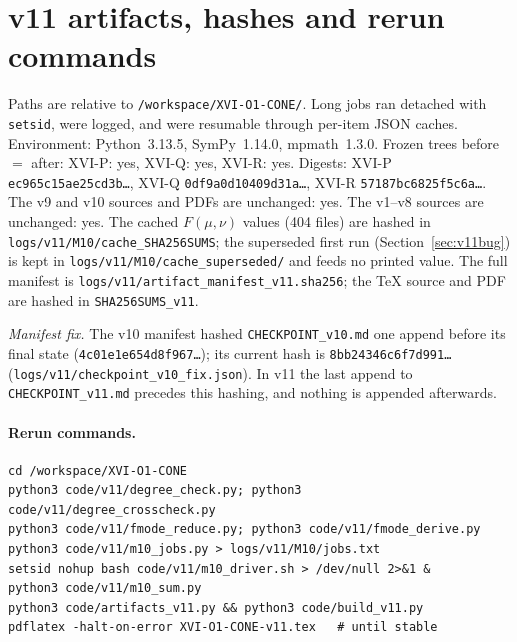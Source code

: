 \documentclass[11pt,a4paper]{article}
\newcommand{\loc}[1]{\nolinkurl{#1}}
\theoremstyle{plain}
\theoremstyle{definition}
\theoremstyle{remark}
\numberwithin{equation}{section}
\begin{document}
\section{v11 artifacts, hashes and rerun commands}
\label{app:v11artifacts}

Paths are relative to \loc{/workspace/XVI-O1-CONE/}. Long jobs ran
detached with \loc{setsid}, were logged, and were resumable through
per-item JSON caches. Environment: Python~3.13.5, SymPy~1.14.0, mpmath~1.3.0.
Frozen trees before \(=\) after: XVI-P: yes, XVI-Q: yes, XVI-R: yes.
Digests: XVI-P \texttt{ec965c15ae25cd3b\ldots}, XVI-Q \texttt{0df9a0d10409d31a\ldots}, XVI-R \texttt{57187bc6825f5c6a\ldots}.
The v9 and v10 sources and PDFs are unchanged: yes. The v1--v8 sources are unchanged: yes.
The cached \(F(\mu,\nu)\) values (404 files) are hashed in \loc{logs/v11/M10/cache_SHA256SUMS}; the
superseded first run (Section~\ref{sec:v11bug}) is kept in \loc{logs/v11/M10/cache_superseded/} and feeds no printed value.
The full manifest is \loc{logs/v11/artifact_manifest_v11.sha256}; the \TeX{} source and PDF are hashed in \loc{SHA256SUMS_v11}.

\emph{Manifest fix.} The v10 manifest hashed \loc{CHECKPOINT_v10.md} one append before its final state
(\texttt{4c01e1e654d8f967\ldots}); its current hash is
\texttt{8bb24346c6f7d991\ldots} (\loc{logs/v11/checkpoint_v10_fix.json}). In v11 the last
append to \loc{CHECKPOINT_v11.md} precedes this hashing, and nothing is appended afterwards.

\paragraph{Rerun commands.}
\begin{verbatim}
cd /workspace/XVI-O1-CONE
python3 code/v11/degree_check.py; python3 code/v11/degree_crosscheck.py
python3 code/v11/fmode_reduce.py; python3 code/v11/fmode_derive.py
python3 code/v11/m10_jobs.py > logs/v11/M10/jobs.txt
setsid nohup bash code/v11/m10_driver.sh > /dev/null 2>&1 &
python3 code/v11/m10_sum.py
python3 code/artifacts_v11.py && python3 code/build_v11.py
pdflatex -halt-on-error XVI-O1-CONE-v11.tex   # until stable
\end{verbatim}
\end{document}
